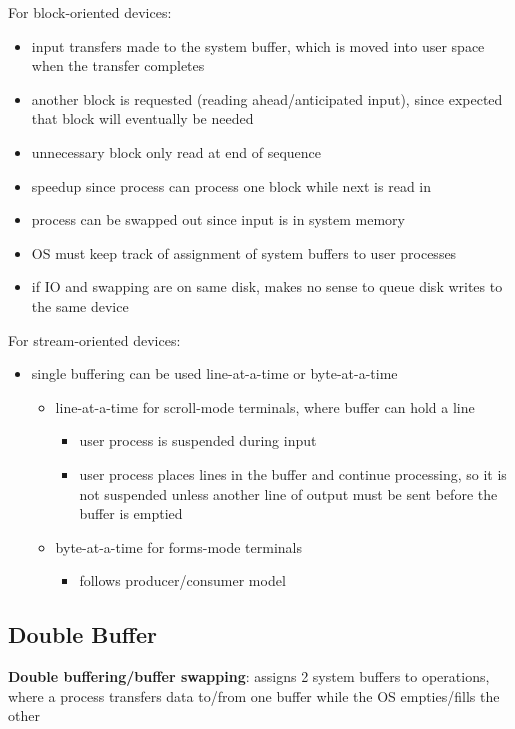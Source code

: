 \documentclass[11pt]{article}
\begin{document}
For block-oriented devices:
\begin{itemize}
\item input transfers made to the system buffer, which is moved into user space when the transfer
completes
\item another block is requested (reading ahead/anticipated input), since expected that block will
eventually be needed
\item unnecessary block only read at end of sequence
\item speedup since process can process one block while next is read in
\item process can be swapped out since input is in system memory
\item OS must keep track of assignment of system buffers to user processes
\item if IO and swapping are on same disk, makes no sense to queue disk writes to the same device
\end{itemize}

For stream-oriented devices:
\begin{itemize}
\item single buffering can be used line-at-a-time or byte-at-a-time
\begin{itemize}
\item line-at-a-time for scroll-mode terminals, where buffer can hold a line
\begin{itemize}
\item user process is suspended during input
\item user process places lines in the buffer and continue processing, so it is not suspended unless
another line of output must be sent before the buffer is emptied
\end{itemize}
\item byte-at-a-time for forms-mode terminals
\begin{itemize}
\item follows producer/consumer model
\end{itemize}
\end{itemize}
\end{itemize}
\subsection{Double Buffer}
\label{sec:org5eb5454}
\textbf{Double buffering/buffer swapping}: assigns 2 system buffers to operations, where a process transfers
data to/from one buffer while the OS empties/fills the other
\end{document}
